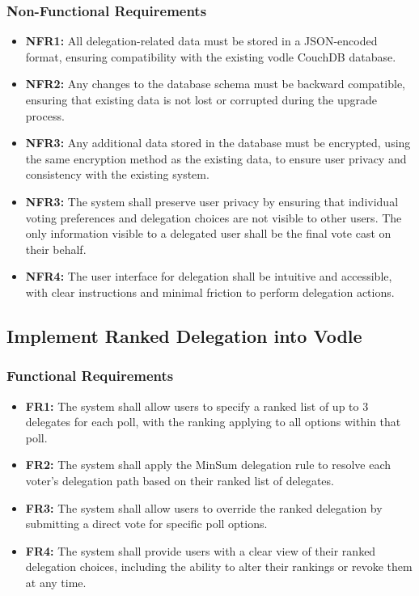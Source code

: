 \subsubsection{Non-Functional Requirements}
\begin{itemize}
    \item \textbf{NFR1:} All delegation-related data must be stored in a JSON-encoded format, ensuring compatibility with the existing vodle CouchDB database.
    \item \textbf{NFR2:} Any changes to the database schema must be backward compatible, ensuring that existing data is not lost or corrupted during the upgrade process.
    \item \textbf{NFR3:} Any additional data stored in the database must be encrypted, using the same encryption method as the existing data, to ensure user privacy and consistency with the existing system.
    \item \textbf{NFR3:} The system shall preserve user privacy by ensuring that individual voting preferences and delegation choices are not visible to other users. The only information visible to a delegated user shall be the final vote cast on their behalf.
    \item \textbf{NFR4:} The user interface for delegation shall be intuitive and accessible, with clear instructions and minimal friction to perform delegation actions.
\end{itemize}

\subsection{Implement Ranked Delegation into Vodle}\label{subsec:requirements_ranked_delegation}

\subsubsection{Functional Requirements}
\begin{itemize}
    \item \textbf{FR1:} The system shall allow users to specify a ranked list of up to 3 delegates for each poll, with the ranking applying to all options within that poll.
    
    \item \textbf{FR2:} The system shall apply the MinSum delegation rule to resolve each voter's delegation path based on their ranked list of delegates.
    
    \item \textbf{FR3:} The system shall allow users to override the ranked delegation by submitting a direct vote for specific poll options.
    
    \item \textbf{FR4:} The system shall provide users with a clear view of their ranked delegation choices, including the ability to alter their rankings or revoke them at any time.
\end{itemize}

